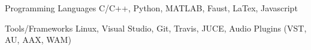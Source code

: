 

\begin{cvskills}

  \cvskill
    {Programming Languages} %
    {C/C++, Python, MATLAB, Faust, LaTex, Javascript} %

    \cvskill
    {Tools/Frameworks} %
    {Linux, Visual Studio, Git, Travis, JUCE, Audio Plugins (VST, AU, AAX, WAM)} %


\end{cvskills}
